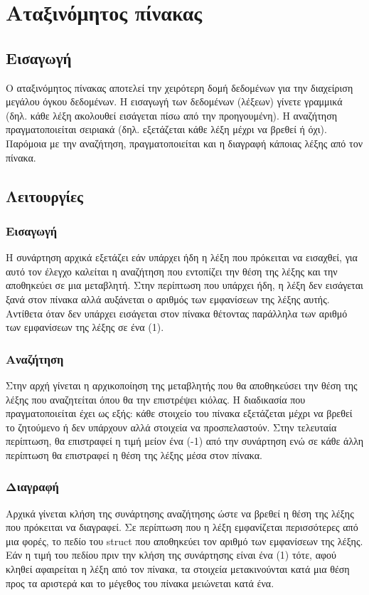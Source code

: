 \chapter{Αταξινόμητος πίνακας}

\section{Εισαγωγή}

Ο αταξινόμητος πίνακας αποτελεί την χειρότερη δομή δεδομένων για την διαχείριση μεγάλου όγκου δεδομένων. Η εισαγωγή των δεδομένων (λέξεων) γίνετε γραμμικά (δηλ. κάθε λέξη ακολουθεί εισάγεται πίσω από την προηγουμένη). Η αναζήτηση πραγματοποιείται σειριακά (δηλ. εξετάζεται κάθε λέξη μέχρι να βρεθεί ή όχι). Παρόμοια με την αναζήτηση, πραγματοποιείται και η διαγραφή κάποιας λέξης από τον πίνακα.

\section{Λειτουργίες}

\subsection{Εισαγωγή}

Η συνάρτηση αρχικά εξετάζει εάν υπάρχει ήδη η λέξη που πρόκειται να εισαχθεί, για αυτό τον έλεγχο καλείται η αναζήτηση που εντοπίζει την θέση της λέξης και την αποθηκεύει σε μια μεταβλητή. Στην περίπτωση που υπάρχει ήδη, η λέξη δεν εισάγεται ξανά στον πίνακα αλλά αυξάνεται ο αριθμός των εμφανίσεων της λέξης αυτής. Αντίθετα όταν δεν υπάρχει εισάγεται στον πίνακα θέτοντας παράλληλα των αριθμό των εμφανίσεων της λέξης σε ένα (1).

\subsection{Αναζήτηση}

Στην αρχή γίνεται η αρχικοποίηση της μεταβλητής που θα αποθηκεύσει την θέση της λέξης που αναζητείται όπου θα την επιστρέψει κιόλας. Η διαδικασία που πραγματοποιείται έχει ως εξής: κάθε στοιχείο του πίνακα εξετάζεται μέχρι να βρεθεί το ζητούμενο ή δεν υπάρχουν αλλά στοιχεία να προσπελαστούν. Στην τελευταία περίπτωση, θα επιστραφεί η τιμή μείον ένα (-1) από την συνάρτηση ενώ σε κάθε άλλη περίπτωση θα επιστραφεί η θέση της λέξης μέσα στον πίνακα. 

\subsection{Διαγραφή}

Αρχικά γίνεται κλήση της συνάρτησης αναζήτησης ώστε να βρεθεί η θέση της λέξης που πρόκειται να διαγραφεί. Σε περίπτωση που η λέξη εμφανίζεται περισσότερες από μια φορές, το πεδίο του struct που αποθηκεύει τον αριθμό των εμφανίσεων της λέξης. Εάν η τιμή του πεδίου πριν την κλήση της συνάρτησης είναι ένα (1) τότε, αφού κληθεί αφαιρείται η λέξη από τον πίνακα, τα στοιχεία μετακινούνται κατά μια θέση προς τα αριστερά και το μέγεθος του πίνακα μειώνεται κατά ένα.
